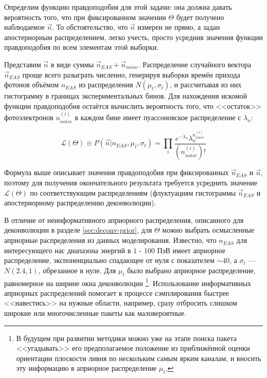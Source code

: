 Определим функцию правдоподобия для этой задачи: она должна давать вероятность того, что при фиксированном значении $\Theta$ будет получено наблюдаемое $\vec{n}$. То обстоятельство, что $\vec{n}$ измерен не прямо, а задан апостериорным распределением, легко учесть, просто усреднив значения функции правдоподобия по всем элементам этой выборки.

Представим $\vec{n}$ в виде суммы $\vec{n}_{EAS} + \vec{n}_{noise}$. Распределение случайного вектора $\vec{n}_{EAS}$ проще всего разыграть численно, генерируя выборки времён прихода фотонов объёмом $n_{EAS}$ из распределения $N(\mu_t, \sigma_t)$, и рассчитывая из них гистограмму в границах экспериментальных бинов. Для нахождения искомой функции правдоподобия остаётся вычислить вероятность того, что <<остаток>> фотоэлектронов $n_{noise}^{(i)}$ в каждом бине имеет пуассоновское распределение с $\lambda_{n}$:

\begin{equation}
	\mathcal{L}(\Theta) \equiv P(\vec{n} | n_{EAS}, \mu_t, \sigma_t) = \prod_{i} \frac{e^{-\lambda_n} \lambda_n^{n_{noise}^{(i)}}}{(n_{noise}^{(i)})!}
\end{equation}

Формула выше описывает значения правдоподобия при фиксированных $\vec{n}_{EAS}$ и  $\vec{n}$, поэтому для получения окончательного результата требуется усреднить значение $\mathcal{L}(\Theta)$ по соответствующим распределениям (флуктуациям гистограммы $\vec{n}_{EAS}$ и апостериорному распределению деконволюции).

В отличие от неинформативного априорного распределения, описанного для деконволюции в разделе \ref{sec:deconv-prior}, для $\Theta$ можно выбрать осмысленные априорные распределения из данных моделирования. Известно, что $n_{EAS}$ для интересующего нас диапазона энергий в $1$ - $100$ ПэВ имеет априорное распределение, экспоненциально спадающее от нуля с показателем $\sim 40$, а $\sigma_t$ --- $N(2.4, 1)$, обрезанное в нуле. Для $\mu_t$ было выбрано априорное распределение, равномерное на ширине окна деконволюции \footnote{В будущем при развитии методики можно уже на этапе поиска пакета <<угадывать>> его предполагаемое положение из приближённой оценки ориентации плоскости ливня по нескольким самым ярким каналам, и вносить эту информацию в априорное распределение $\mu_t$.}. Использование информативных априорных распределений помогает в процессе сэмплирования быстрее <<навестись>> на нужные области, например, сразу отбросить слишком широкие или многочисленные пакеты как маловероятные.

